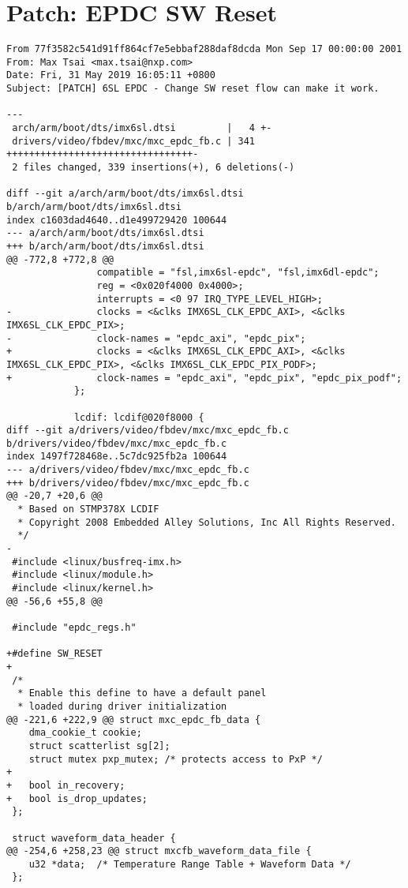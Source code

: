 \documentclass{memoir}
\begin{document}
\chapter{Patch: EPDC SW Reset}
\label{patchepdcreset}
\begin{verbatim}
From 77f3582c541d91ff864cf7e5ebbaf288daf8dcda Mon Sep 17 00:00:00 2001
From: Max Tsai <max.tsai@nxp.com>
Date: Fri, 31 May 2019 16:05:11 +0800
Subject: [PATCH] 6SL EPDC - Change SW reset flow can make it work.

---
 arch/arm/boot/dts/imx6sl.dtsi         |   4 +-
 drivers/video/fbdev/mxc/mxc_epdc_fb.c | 341 +++++++++++++++++++++++++++++++++-
 2 files changed, 339 insertions(+), 6 deletions(-)

diff --git a/arch/arm/boot/dts/imx6sl.dtsi b/arch/arm/boot/dts/imx6sl.dtsi
index c1603dad4640..d1e499729420 100644
--- a/arch/arm/boot/dts/imx6sl.dtsi
+++ b/arch/arm/boot/dts/imx6sl.dtsi
@@ -772,8 +772,8 @@
 				compatible = "fsl,imx6sl-epdc", "fsl,imx6dl-epdc";
 				reg = <0x020f4000 0x4000>;
 				interrupts = <0 97 IRQ_TYPE_LEVEL_HIGH>;
-				clocks = <&clks IMX6SL_CLK_EPDC_AXI>, <&clks IMX6SL_CLK_EPDC_PIX>;
-				clock-names = "epdc_axi", "epdc_pix";
+				clocks = <&clks IMX6SL_CLK_EPDC_AXI>, <&clks IMX6SL_CLK_EPDC_PIX>, <&clks IMX6SL_CLK_EPDC_PIX_PODF>;
+				clock-names = "epdc_axi", "epdc_pix", "epdc_pix_podf";
 			};
 
 			lcdif: lcdif@020f8000 {
diff --git a/drivers/video/fbdev/mxc/mxc_epdc_fb.c b/drivers/video/fbdev/mxc/mxc_epdc_fb.c
index 1497f728468e..5c7dc925fb2a 100644
--- a/drivers/video/fbdev/mxc/mxc_epdc_fb.c
+++ b/drivers/video/fbdev/mxc/mxc_epdc_fb.c
@@ -20,7 +20,6 @@
  * Based on STMP378X LCDIF
  * Copyright 2008 Embedded Alley Solutions, Inc All Rights Reserved.
  */
-
 #include <linux/busfreq-imx.h>
 #include <linux/module.h>
 #include <linux/kernel.h>
@@ -56,6 +55,8 @@
 
 #include "epdc_regs.h"
 
+#define SW_RESET
+
 /*
  * Enable this define to have a default panel
  * loaded during driver initialization
@@ -221,6 +222,9 @@ struct mxc_epdc_fb_data {
 	dma_cookie_t cookie;
 	struct scatterlist sg[2];
 	struct mutex pxp_mutex; /* protects access to PxP */
+
+	bool in_recovery;
+	bool is_drop_updates;
 };
 
 struct waveform_data_header {
@@ -254,6 +258,23 @@ struct mxcfb_waveform_data_file {
 	u32 *data;	/* Temperature Range Table + Waveform Data */
 };
 

\end{verbatim}
\end{document}
